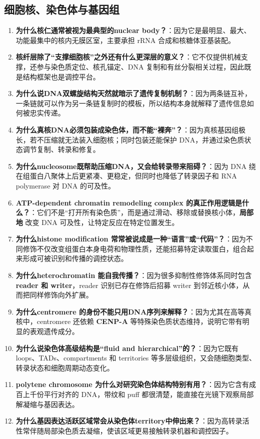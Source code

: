 \documentclass[12pt,fontset=none]{ctexart}
\begin{document}
\subsection*{细胞核、染色体与基因组}
\begin{enumerate}
\item \textbf{为什么核仁通常被视为最典型的nuclear body？}：因为它是最明显、最大、功能最集中的核内无膜区室，主要承担 rRNA 合成和核糖体亚基装配。

\item \textbf{核纤层除了“支撑细胞核”之外还有什么更深层的意义？}：它不仅提供机械支撑，还参与染色质定位、核孔锚定、DNA 复制和有丝分裂相关过程，因此既是结构框架也是调控平台。

\item \textbf{为什么说DNA双螺旋结构天然就暗示了遗传复制机制？}：因为两条链互补，一条链就可以作为另一条链复制时的模板，所以结构本身就解释了遗传信息如何被忠实传递。

\item \textbf{为什么真核DNA必须包装成染色体，而不能“裸奔”？}：因为真核基因组极长，若不压缩就无法装入细胞核；同时包装还能保护 DNA，并通过染色质状态调节复制、转录和修复。

\item \textbf{为什么nucleosome既帮助压缩DNA，又会给转录带来阻碍？}：因为 DNA 绕在组蛋白八聚体上后更紧凑、更稳定，但同时也降低了转录因子和 RNA polymerase 对 DNA 的可及性。

\item \textbf{ATP-dependent chromatin remodeling complex 的真正作用逻辑是什么？}：它们不是“打开所有染色质”，而是通过滑动、移除或替换核小体，\textbf{局部地} 改变 DNA 可及性，让特定反应在特定位置发生。

\item \textbf{为什么histone modification 常常被说成是一种“语言”或“代码”？}：因为不同修饰不仅改变组蛋白本身电荷和物理性质，还能招募特定读取蛋白，组合起来形成可被识别和传播的调控状态。

\item \textbf{为什么heterochromatin 能自我传播？}：因为很多抑制性修饰体系同时包含 \textbf{reader 和 writer}，reader 识别已存在修饰后招募 writer 到邻近核小体，从而把同样修饰向外扩展。

\item \textbf{为什么centromere 的身份不能只用DNA序列来解释？}：因为尤其在高等真核中，centromere 还依赖 \textbf{CENP-A} 等特殊染色质状态维持，说明它带有明显的表观遗传成分。

\item \textbf{为什么说染色体高级结构是“fluid and hierarchical”的？}：因为它既有 loops、TADs、compartments 和 territories 等多层级组织，又会随细胞类型、转录状态和细胞周期动态变化。

\item \textbf{polytene chromosome 为什么对研究染色体结构特别有用？}：因为它含有成百上千份平行对齐的 DNA，带纹和 puff 都很清楚，能直接在光镜下观察局部解凝缩与基因表达。

\item \textbf{为什么基因表达活跃区域常会从染色体territory中伸出来？}：因为高转录活性常伴随局部染色质去凝缩，使该区域更易接触转录机器和调控因子。
\end{enumerate}
\end{document}
